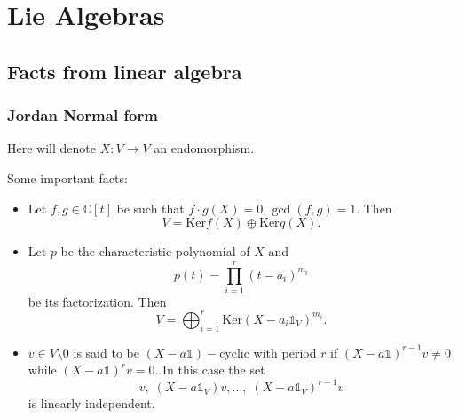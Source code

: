 \chapter{Lie Algebras}
\section{Facts from linear algebra}
\subsection{Jordan Normal form}
Here will denote $X:V\rightarrow V$ an endomorphism.\par
Some important facts:
\begin{itemize}
    \item Let $f,g\in\mathbb{C}[t]$ be such that $f\cdot g(X)=0, \gcd(f,g)=1$. Then 
    \begin{equation}
        V = \text{Ker}f(X)\oplus \text{Ker}g(X).
    \end{equation}
    \item Let $p$ be the characteristic polynomial of $X$ and 
    \begin{equation}
        p(t)=\prod_{i=1}^r(t-a_i)^{m_i}
    \end{equation}
    be its factorization. Then 
    \begin{equation}
        V = \bigoplus_{i=1}^r\text{Ker}(X-a_i\mathds{1}_V)^{m_i}.
    \end{equation}
    \item $v\in V\setminus0$ is said to be $(X-a\mathds{1})-$cyclic with period $r$ if 
    $(X-a\mathds{1})^{r-1}v\neq0$ while $(X-a\mathds{1})^rv=0$. In this case the set
    \begin{equation}
        v,\;(X-a\mathds{1}_V)v,\dots,\;(X-a\mathds{1}_V)^{r-1}v
    \end{equation}
    is linearly independent.
\end{itemize}

